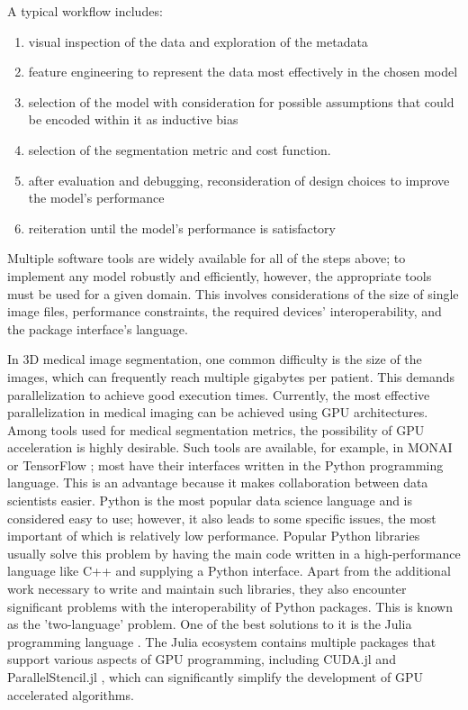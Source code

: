 \documentclass{juliacon}
\begin{document}
A typical workflow includes:
\begin{enumerate}
  \item visual inspection of  the data and exploration of the metadata
  \item feature engineering to represent the data most effectively in the chosen model
  \item selection of the model with consideration for possible assumptions that could be encoded within it as inductive bias
  \item selection of the segmentation metric and cost function.
  \item after evaluation and debugging, reconsideration of  design choices to improve the model's performance
  \item reiteration until the model's performance is satisfactory
\end{enumerate}

Multiple software tools are widely available for all of the steps above; to implement any model robustly and efficiently, however, the appropriate tools must be used for a given domain. This involves considerations of the size of single image files, performance constraints, the required devices' interoperability, and the package interface's language.

In 3D medical image segmentation, one common difficulty is the size of the images, which can frequently reach multiple gigabytes per patient. This demands parallelization to achieve good execution times. Currently, the most effective parallelization in medical imaging can be achieved using GPU architectures. Among tools used for medical segmentation metrics, the possibility of GPU acceleration is highly desirable. Such tools are available, for example, in MONAI \cite{MONAI} or TensorFlow \cite{tensorflow}; most have their interfaces written in the Python programming language. This is an advantage because it makes collaboration between data scientists easier. Python is the most popular data science language and is considered easy to use; however, it also leads to some specific issues, the most important of which is relatively low performance. Popular Python libraries usually solve this problem by having the main code written in a high-performance language like C++ and supplying a Python interface. Apart from the additional work necessary to write and maintain such libraries, they also encounter significant problems with the interoperability of Python packages. This is known as the 'two-language' problem. One of the best solutions to it is the Julia programming language \cite{Julia}. The Julia ecosystem contains multiple packages that support various aspects of GPU programming, including CUDA.jl \cite{besard2019prototyping} and ParallelStencil.jl \cite{ParallelStencil}, which can significantly simplify the development of GPU accelerated algorithms.
\end{document}
